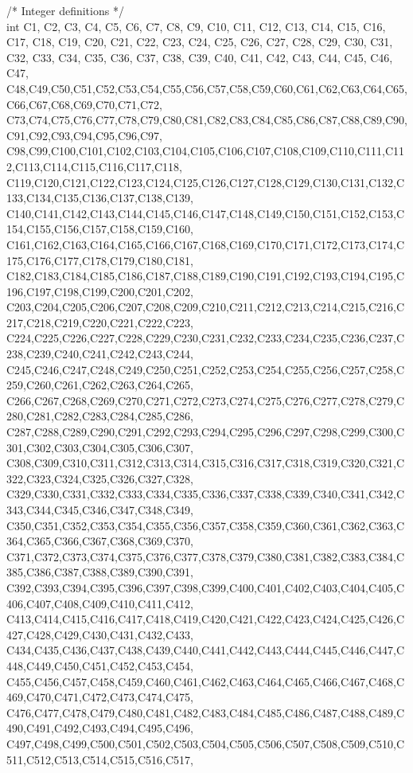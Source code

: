 /* Integer definitions */ \\
int C1, C2, C3, C4, C5, C6, C7, C8, C9, C10, C11, C12, C13, C14, C15, C16, C17, C18, C19, C20, C21, C22, C23, C24, C25, C26, C27, C28, C29, C30, C31, C32, C33, C34, C35, C36, C37, C38, C39, C40, C41, C42, C43, C44, C45, C46, C47, C48,C49,C50,C51,C52,C53,C54,C55,C56,C57,C58,C59,C60,C61,C62,C63,C64,C65,C66,C67,C68,C69,C70,C71,C72,
C73,C74,C75,C76,C77,C78,C79,C80,C81,C82,C83,C84,C85,C86,C87,C88,C89,C90,C91,C92,C93,C94,C95,C96,C97,
C98,C99,C100,C101,C102,C103,C104,C105,C106,C107,C108,C109,C110,C111,C112,C113,C114,C115,C116,C117,C118,
C119,C120,C121,C122,C123,C124,C125,C126,C127,C128,C129,C130,C131,C132,C133,C134,C135,C136,C137,C138,C139,
C140,C141,C142,C143,C144,C145,C146,C147,C148,C149,C150,C151,C152,C153,C154,C155,C156,C157,C158,C159,C160,
C161,C162,C163,C164,C165,C166,C167,C168,C169,C170,C171,C172,C173,C174,C175,C176,C177,C178,C179,C180,C181,
C182,C183,C184,C185,C186,C187,C188,C189,C190,C191,C192,C193,C194,C195,C196,C197,C198,C199,C200,C201,C202,
C203,C204,C205,C206,C207,C208,C209,C210,C211,C212,C213,C214,C215,C216,C217,C218,C219,C220,C221,C222,C223,
C224,C225,C226,C227,C228,C229,C230,C231,C232,C233,C234,C235,C236,C237,C238,C239,C240,C241,C242,C243,C244,
C245,C246,C247,C248,C249,C250,C251,C252,C253,C254,C255,C256,C257,C258,C259,C260,C261,C262,C263,C264,C265,
C266,C267,C268,C269,C270,C271,C272,C273,C274,C275,C276,C277,C278,C279,C280,C281,C282,C283,C284,C285,C286,
C287,C288,C289,C290,C291,C292,C293,C294,C295,C296,C297,C298,C299,C300,C301,C302,C303,C304,C305,C306,C307,
C308,C309,C310,C311,C312,C313,C314,C315,C316,C317,C318,C319,C320,C321,C322,C323,C324,C325,C326,C327,C328,
C329,C330,C331,C332,C333,C334,C335,C336,C337,C338,C339,C340,C341,C342,C343,C344,C345,C346,C347,C348,C349,
C350,C351,C352,C353,C354,C355,C356,C357,C358,C359,C360,C361,C362,C363,C364,C365,C366,C367,C368,C369,C370,
C371,C372,C373,C374,C375,C376,C377,C378,C379,C380,C381,C382,C383,C384,C385,C386,C387,C388,C389,C390,C391,
C392,C393,C394,C395,C396,C397,C398,C399,C400,C401,C402,C403,C404,C405,C406,C407,C408,C409,C410,C411,C412,
C413,C414,C415,C416,C417,C418,C419,C420,C421,C422,C423,C424,C425,C426,C427,C428,C429,C430,C431,C432,C433,
C434,C435,C436,C437,C438,C439,C440,C441,C442,C443,C444,C445,C446,C447,C448,C449,C450,C451,C452,C453,C454,
C455,C456,C457,C458,C459,C460,C461,C462,C463,C464,C465,C466,C467,C468,C469,C470,C471,C472,C473,C474,C475,
C476,C477,C478,C479,C480,C481,C482,C483,C484,C485,C486,C487,C488,C489,C490,C491,C492,C493,C494,C495,C496,
C497,C498,C499,C500,C501,C502,C503,C504,C505,C506,C507,C508,C509,C510,C511,C512,C513,C514,C515,C516,C517,
